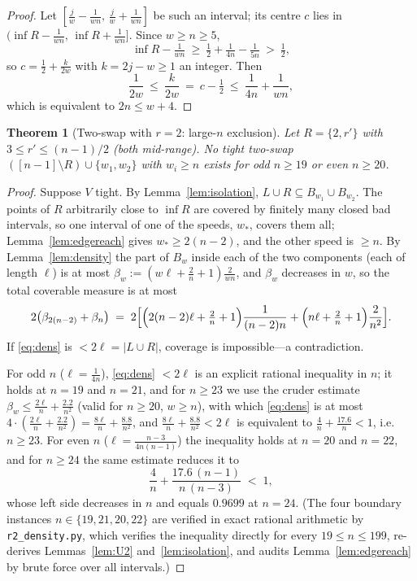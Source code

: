 \documentclass[11pt]{article}
\newtheorem{theorem}{Theorem}[section]
\theoremstyle{definition}
\begin{document}
\begin{proof}
Let $[\frac jw-\frac1{wn},\,\frac jw+\frac1{wn}]$ be such an interval;
its centre $c$ lies in $(\inf R-\frac1{wn},\,\inf R+\frac1{wn}]$.  Since
$w\ge n\ge5$,
\[
\inf R-\tfrac1{wn}\ \ge\ \tfrac12+\tfrac1{4n}-\tfrac1{5n}\ >\ \tfrac12,
\]
so $c=\tfrac12+\tfrac{k}{2w}$ with $k=2j-w\ge1$ an integer.  Then
\[
\frac1{2w}\ \le\ \frac{k}{2w}\ =\ c-\tfrac12\ \le\
\frac1{4n}+\frac1{wn},
\]
which is equivalent to $2n\le w+4$.
\end{proof}

\begin{theorem}[Two-swap with $r=2$: large-$n$ exclusion]\label{thm:r2large}
Let $R=\{2,r'\}$ with $3\le r'\le(n-1)/2$ (both mid-range).  No tight
two-swap $([n-1]\setminus R)\cup\{w_1,w_2\}$ with $w_i\ge n$ exists for
odd $n\ge19$ or even $n\ge20$.
\end{theorem}

\begin{proof}
Suppose $V$ tight.  By Lemma~\ref{lem:isolation}, $L\cup R\subseteq
B_{w_1}\cup B_{w_2}$.  The points of $R$ arbitrarily close to $\inf R$
are covered by finitely many closed bad intervals, so one interval of one
of the speeds, $w_*$, covers them all; Lemma~\ref{lem:edgereach} gives
$w_*\ge2(n-2)$, and the other speed is $\ge n$.  By
Lemma~\ref{lem:density} the part of $B_w$ inside each of the two
components (each of length $\ell$) is at most
$\beta_w:=(w\ell+\frac2n+1)\frac{2}{wn}$, and $\beta_w$ decreases in
$w$, so the total coverable measure is at most
\begin{equation}\label{eq:dens}
2\bigl(\beta_{2(n-2)}+\beta_n\bigr)
\;=\;2\Bigl[\Bigl(2(n-2)\ell+\tfrac2n+1\Bigr)\frac{1}{(n-2)n}
+\Bigl(n\ell+\tfrac2n+1\Bigr)\frac{2}{n^2}\Bigr].
\end{equation}
If \eqref{eq:dens} is $<2\ell=|L\cup R|$, coverage is impossible---a
contradiction.

For odd $n$ ($\ell=\frac1{4n}$), \eqref{eq:dens} $<2\ell$ is an explicit
rational inequality in $n$; it holds at $n=19$ and $n=21$, and for
$n\ge23$ we use the cruder estimate
$\beta_w\le\frac{2\ell}{n}+\frac{2.2}{n^2}$ (valid for $n\ge20$, $w\ge n$),
with which \eqref{eq:dens} is at most $4\cdot(\frac{2\ell}n+
\frac{2.2}{n^2})=\frac{8\ell}{n}+\frac{8.8}{n^2}$, and
$\frac{8\ell}{n}+\frac{8.8}{n^2}<2\ell$ is equivalent to
$\frac4n+\frac{17.6}{n}<1$, i.e.\ $n\ge23$.
For even $n$ ($\ell=\frac{n-3}{4n(n-1)}$) the inequality holds at $n=20$
and $n=22$, and for $n\ge24$ the same estimate reduces it to
\[
\frac4n+\frac{17.6\,(n-1)}{n\,(n-3)}\;<\;1,
\]
whose left side decreases in $n$ and equals $0.9699$ at $n=24$.
(The four boundary instances $n\in\{19,21,20,22\}$ are verified in exact
rational arithmetic by \texttt{r2\_density.py}, which verifies the
inequality directly for every $19\le n\le199$, re-derives
Lemmas~\ref{lem:U2} and~\ref{lem:isolation}, and audits
Lemma~\ref{lem:edgereach} by brute force over all intervals.)
\end{proof}
\end{document}

